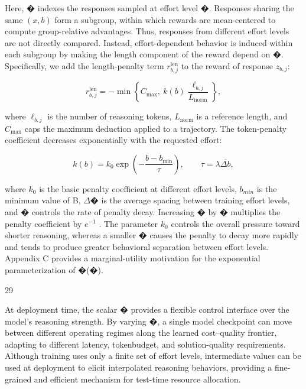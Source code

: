 \documentclass[
  10
]{article}
\begin{document}
Here, � indexes the responses sampled at effort level �. Responses
sharing the same \(( x , b )\) form a subgroup, within which rewards are
mean-centered to compute group-relative advantages. Thus, responses from
different effort levels are not directly compared. Instead,
effort-dependent behavior is induced within each subgroup by making the
length component of the reward depend on �. Specifically, we add the
length-penalty term \(r _ { b , j } ^ { \mathrm { l e n } }\) to the
reward of response \(z _ { b , j } \mathrm { : }\)

\[
r _ { b , j } ^ { \mathrm { l e n } } = - \operatorname* { m i n } \left\{ C _ { \mathrm { m a x } } , \ k ( b ) \frac { \ell _ { b , j } } { L _ { \mathrm { n o r m } } } \right\} ,\tag{9}
\]

where \(\ell _ { b , j }\) is the number of reasoning tokens,
\(L _ { \mathrm { n o r m } }\) is a reference length, and
\(C _ { \mathrm { m a x } }\) caps the maximum deduction applied to a
trajectory. The token-penalty coefficient decreases exponentially with
the requested effort:

\[
k ( b ) = k _ { 0 } \exp \left( - \frac { b - b _ { \mathrm { m i n } } } { \tau } \right) , \qquad \tau = \lambda \overline { { \Delta b } } ,\tag{10}
\]

where \(k _ { 0 }\) is the basic penalty coefficient at different effort
levels, \(b _ { m i n }\) is the minimum value of B, $\Delta$� is the average
spacing between training effort levels, and � controls the rate of
penalty decay. Increasing � by � multiplies the penalty coefficient by
\(e ^ { - 1 }\) . The parameter \(k _ { 0 }\) controls the overall
pressure toward shorter reasoning, whereas a smaller � causes the
penalty to decay more rapidly and tends to produce greater behavioral
separation between effort levels. Appendix C provides a marginal-utility
motivation for the exponential parameterization of �(�).

29

At deployment time, the scalar � provides a flexible control interface
over the model's reasoning strength. By varying �, a single model
checkpoint can move between different operating regimes along the
learned cost--quality frontier, adapting to different latency,
tokenbudget, and solution-quality requirements. Although training uses
only a finite set of effort levels, intermediate values can be used at
deployment to elicit interpolated reasoning behaviors, providing a
fine-grained and efficient mechanism for test-time resource allocation.
\end{document}
